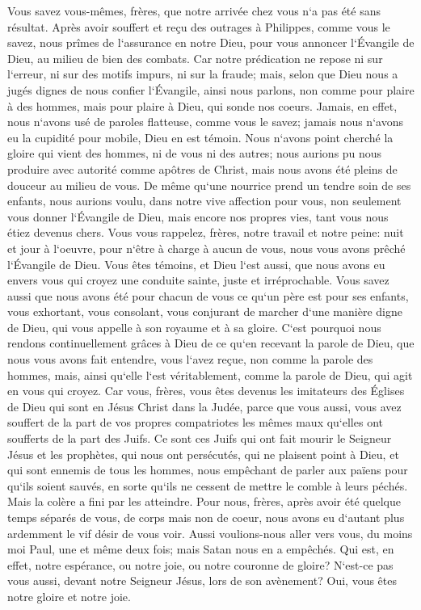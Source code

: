 \verse Vous savez vous-mêmes, frères, que notre arrivée chez vous n`a pas été sans résultat. 
\verse Après avoir souffert et reçu des outrages à Philippes, comme vous le savez, nous prîmes de l`assurance en notre Dieu, pour vous annoncer l`Évangile de Dieu, au milieu de bien des combats. 
\verse Car notre prédication ne repose ni sur l`erreur, ni sur des motifs impurs, ni sur la fraude; 
\verse mais, selon que Dieu nous a jugés dignes de nous confier l`Évangile, ainsi nous parlons, non comme pour plaire à des hommes, mais pour plaire à Dieu, qui sonde nos coeurs. 
\verse Jamais, en effet, nous n`avons usé de paroles flatteuse, comme vous le savez; jamais nous n`avons eu la cupidité pour mobile, Dieu en est témoin. 
\verse Nous n`avons point cherché la gloire qui vient des hommes, ni de vous ni des autres; nous aurions pu nous produire avec autorité comme apôtres de Christ, 
\verse mais nous avons été pleins de douceur au milieu de vous. De même qu`une nourrice prend un tendre soin de ses enfants, 
\verse nous aurions voulu, dans notre vive affection pour vous, non seulement vous donner l`Évangile de Dieu, mais encore nos propres vies, tant vous nous étiez devenus chers. 
\verse Vous vous rappelez, frères, notre travail et notre peine: nuit et jour à l`oeuvre, pour n`être à charge à aucun de vous, nous vous avons prêché l`Évangile de Dieu. 
\verse Vous êtes témoins, et Dieu l`est aussi, que nous avons eu envers vous qui croyez une conduite sainte, juste et irréprochable. 
\verse Vous savez aussi que nous avons été pour chacun de vous ce qu`un père est pour ses enfants, 
\verse vous exhortant, vous consolant, vous conjurant de marcher d`une manière digne de Dieu, qui vous appelle à son royaume et à sa gloire. 
\verse C`est pourquoi nous rendons continuellement grâces à Dieu de ce qu`en recevant la parole de Dieu, que nous vous avons fait entendre, vous l`avez reçue, non comme la parole des hommes, mais, ainsi qu`elle l`est véritablement, comme la parole de Dieu, qui agit en vous qui croyez. 
\verse Car vous, frères, vous êtes devenus les imitateurs des Églises de Dieu qui sont en Jésus Christ dans la Judée, parce que vous aussi, vous avez souffert de la part de vos propres compatriotes les mêmes maux qu`elles ont soufferts de la part des Juifs. 
\verse Ce sont ces Juifs qui ont fait mourir le Seigneur Jésus et les prophètes, qui nous ont persécutés, qui ne plaisent point à Dieu, et qui sont ennemis de tous les hommes, 
\verse nous empêchant de parler aux païens pour qu`ils soient sauvés, en sorte qu`ils ne cessent de mettre le comble à leurs péchés. Mais la colère a fini par les atteindre. 
\verse Pour nous, frères, après avoir été quelque temps séparés de vous, de corps mais non de coeur, nous avons eu d`autant plus ardemment le vif désir de vous voir. 
\verse Aussi voulions-nous aller vers vous, du moins moi Paul, une et même deux fois; mais Satan nous en a empêchés. 
\verse Qui est, en effet, notre espérance, ou notre joie, ou notre couronne de gloire? N`est-ce pas vous aussi, devant notre Seigneur Jésus, lors de son avènement? 
\verse Oui, vous êtes notre gloire et notre joie. 

